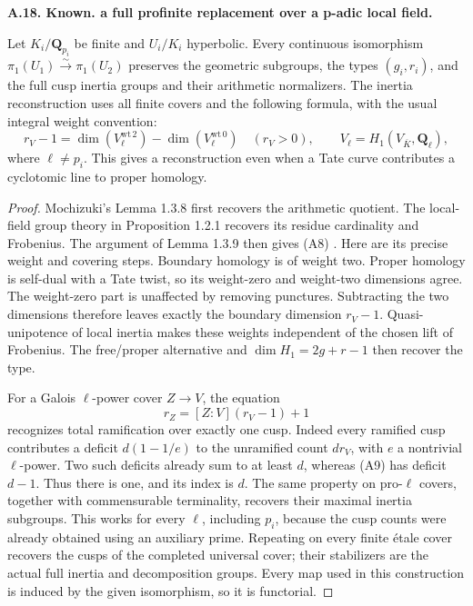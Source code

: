 \documentclass[11pt,oneside]{article}
\makeatletter
\newcounter{statementanchor}
\newenvironment{statement}[3]{%
 \refstepcounter{statementanchor}\def\@currentlabel{#1}%
 \par\addvspace{9pt}\noindent
 \textbf{#1. #2. #3.}\par\nobreak\noindent\ignorespaces
}{\par\addvspace{5pt}}
\makeatother
\begin{document}
\begin{statement}{A.18}{Known}{a full profinite replacement over a p-adic local field}
\label{st:A.18}
\label{A:padic-cusp-reconstruction}
Let $K_i/\mathbf Q_{p_i}$ be finite and $U_i/K_i$
hyperbolic.  Every continuous isomorphism
$\pi_1(U_1)\xrightarrow{\sim}\pi_1(U_2)$ preserves
the geometric subgroups, the types $(g_i,r_i)$, and
the full cusp inertia groups and their arithmetic
normalizers.  The inertia reconstruction uses all
finite covers and the following formula, with the
usual integral weight convention:
\[
 r_V-1=\dim(V_\ell^{\mathrm{wt}\,2})
            -\dim(V_\ell^{\mathrm{wt}\,0})
 \quad(r_V>0),
 \qquad V_\ell=H_1(V_{\overline K},\mathbf Q_\ell),
                                                               \tag{A8}
\]
where $\ell\ne p_i$.  This gives a reconstruction even
when a Tate curve contributes a cyclotomic line to
proper homology.
\end{statement}
\begin{proof}
Mochizuki's Lemma 1.3.8 first recovers the arithmetic
quotient.  The local-field group theory in Proposition
1.2.1 recovers its residue cardinality and Frobenius.
The argument of Lemma 1.3.9 then gives (A8)
\cite{A_Mochizuki2004}.  Here are its precise weight
and covering steps.  Boundary homology is of weight
two.  Proper homology is self-dual with a Tate twist,
so its weight-zero and weight-two dimensions agree.
The weight-zero part is unaffected by removing
punctures.  Subtracting the two dimensions therefore
leaves exactly the boundary dimension $r_V-1$.
Quasi-unipotence of local inertia makes these weights
independent of the chosen lift of Frobenius.  The
free/proper alternative and
$\dim H_1=2g+r-1$ then recover the type.

For a Galois $\ell$-power cover $Z\to V$, the equation
\[
          r_Z=[Z:V](r_V-1)+1                              \tag{A9}
\]
recognizes total ramification over exactly one cusp.
Indeed every ramified cusp contributes a deficit
$d(1-1/e)$ to the unramified count $dr_V$, with
$e$ a nontrivial $\ell$-power.  Two such deficits
already sum to at least $d$, whereas (A9) has
deficit $d-1$.  Thus there is one, and its index
is $d$.  The same property on pro-$\ell$ covers,
together with commensurable terminality, recovers
their maximal inertia subgroups.  This works for
every $\ell$, including $p_i$, because the cusp
counts were already obtained using an auxiliary
prime.  Repeating on every finite \'etale cover
recovers the cusps of the completed universal
cover; their stabilizers are the actual full
inertia and decomposition groups.  Every map
used in this construction is induced by the
given isomorphism, so it is functorial.
\end{proof}
\end{document}
